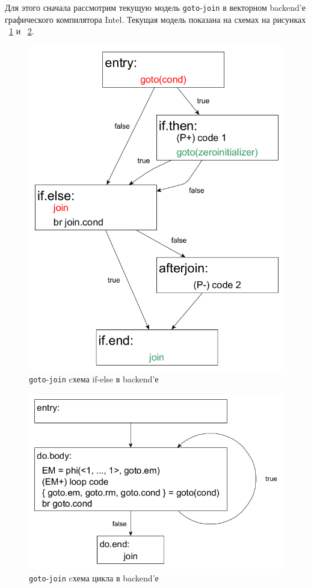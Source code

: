 Для этого сначала рассмотрим текущую модель \texttt{goto}-\texttt{join} в
векторном backend'е графического компилятора Intel. Текущая модель показана на
схемах на рисунках ~\ref{fig:if-goto-join-BE} и ~\ref{fig:loop-goto-join-BE}.
\begin{figure}
  \centering
  \includegraphics[scale=0.27]{Images/if-else-BE-current.png}
  \caption{\texttt{goto}-\texttt{join} cхема if-else в backend'е}
  \label{fig:if-goto-join-BE}
\end{figure}
\begin{figure}
  \centering
  \includegraphics[scale=0.27]{Images/do-while-BE-current.png}
  \caption{\texttt{goto}-\texttt{join} cхема цикла в backend'е}
  \label{fig:loop-goto-join-BE}
\end{figure}

